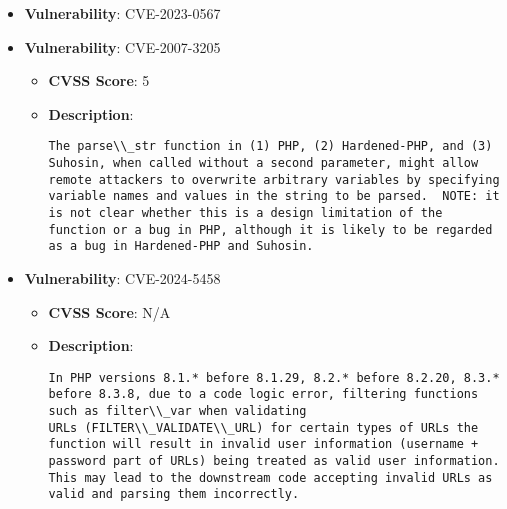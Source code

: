 \documentclass{article}
\begin{document}
\begin{itemize}
\begin{itemize}
{PHP Windows builds for the versions 8.1.29, 8.2.20 and 8.3.8 and above include OpenSSL patches that fix the vulnerability.|
            }
        \end{itemize}
    
        \item \textbf{Vulnerability}: CVE-2023-0567
    
        \item \textbf{Vulnerability}: CVE-2007-3205
        \begin{itemize}
            \item \textbf{CVSS Score}:  5 
            \item \textbf{Description}:
            \parbox[t]{0.9\linewidth}{
                \verb|The parse\\_str function in (1) PHP, (2) Hardened-PHP, and (3) Suhosin, when called without a second parameter, might allow remote attackers to overwrite arbitrary variables by specifying variable names and values in the string to be parsed.  NOTE: it is not clear whether this is a design limitation of the function or a bug in PHP, although it is likely to be regarded as a bug in Hardened-PHP and Suhosin.|
            }
        \end{itemize}
    
        \item \textbf{Vulnerability}: CVE-2024-5458
        \begin{itemize}
            \item \textbf{CVSS Score}:  N/A 
            \item \textbf{Description}:
            \parbox[t]{0.9\linewidth}{
                \verb|In PHP versions 8.1.* before 8.1.29, 8.2.* before 8.2.20, 8.3.* before 8.3.8, due to a code logic error, filtering functions such as filter\\_var when validating URLs (FILTER\\_VALIDATE\\_URL) for certain types of URLs the function will result in invalid user information (username + password part of URLs) being treated as valid user information. This may lead to the downstream code accepting invalid URLs as valid and parsing them incorrectly.|
            }
        \end{itemize}
    
\end{itemize}
\end{document}
